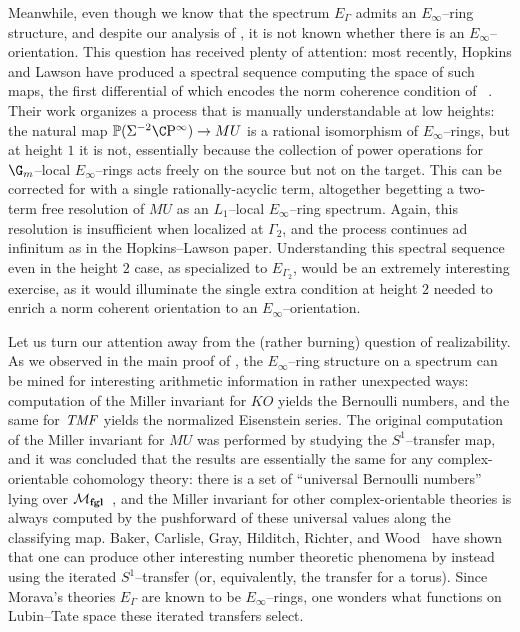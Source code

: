 Meanwhile, even though we know that the spectrum \(E_\Gamma\) admits an \(E_\infty\)--ring structure, and despite our analysis of , it is not known whether there is an \(E_\infty\)--orientation.  This question has received plenty of attention: most recently, Hopkins and Lawson have produced a spectral sequence computing the space of such maps, the first differential of which encodes the norm coherence condition of ~\cite{HopkinsLawson}.  Their work organizes a process that is manually understandable at low heights: the natural map \(\mathbb P(\Susp^{-2} \CP^\infty) \to MU\) is a rational isomorphism of \(E_\infty\)--rings, but at height \(1\) it is not, essentially because the collection of power operations for \(\G_m\)--local \(E_\infty\)--rings acts freely on the source but not on the target.  This can be corrected for with a single rationally-acyclic term, altogether begetting a two-term free resolution of \(MU\) as an \(L_1\)--local \(E_\infty\)--ring spectrum.  Again, this resolution is insufficient when localized at \(\Gamma_2\), and the process continues ad infinitum as in the Hopkins--Lawson paper.  Understanding this spectral sequence even in the height \(2\) case, as specialized to \(E_{\Gamma_2}\), would be an extremely interesting exercise, as it would illuminate the single extra condition at height \(2\) needed to enrich a norm coherent orientation to an \(E_\infty\)--orientation.







Let us turn our attention away from the (rather burning) question of realizability.  As we observed in the main proof of , the \(E_\infty\)--ring structure on a spectrum can be mined for interesting arithmetic information in rather unexpected ways: computation of the Miller invariant for \(KO\) yields the Bernoulli numbers, and the same for \(\mathit{TMF}\) yields the normalized Eisenstein series.  The original computation of the Miller invariant for \(MU\) was performed by studying the \(S^1\)--transfer map, and it was concluded that the results are essentially the same for any complex-orientable cohomology theory: there is a set of ``universal Bernoulli numbers'' lying over \(\mathcal{M}_{\mathbf{fgl}}\)~\cite{MillerBernoulliNos}, and the Miller invariant for other complex-orientable theories is always computed by the pushforward of these universal values along the classifying map.  Baker, Carlisle, Gray, Hilditch, Richter, and Wood~\cite{BCGHRW} have shown that one can produce other interesting number theoretic phenomena by instead using the iterated \(S^1\)--transfer (or, equivalently, the transfer for a torus).  Since Morava's theories \(E_\Gamma\) are known to be \(E_\infty\)--rings, one wonders what functions on Lubin--Tate space these iterated transfers select.

